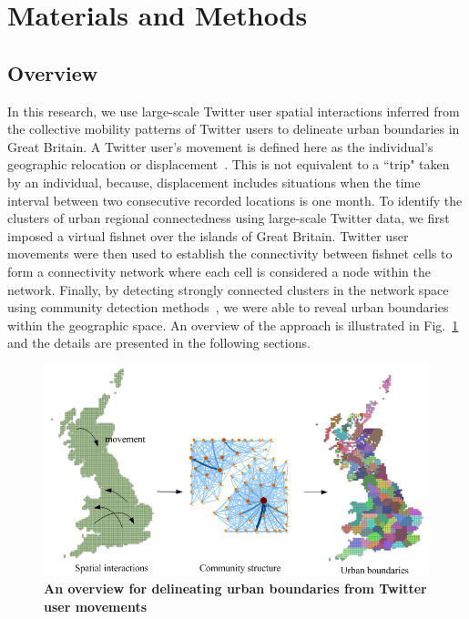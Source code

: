 \documentclass[]{tGIS2e}
\begin{document}
{\section{Materials and Methods}
\subsection{Overview}
In this research, we use large-scale Twitter user spatial interactions inferred from the collective mobility patterns of Twitter users to delineate urban boundaries in Great Britain.
A Twitter user's movement is defined here as the individual's geographic relocation or displacement~\citep{gonzalez2008}.
This is not equivalent to a ``trip" taken by an individual, because, displacement includes situations when the time interval between two consecutive recorded locations is one month.
To identify the clusters of urban regional connectedness using large-scale Twitter data, we first imposed a virtual fishnet over the islands of Great Britain.
Twitter user movements were then used to establish the connectivity between fishnet cells to form a connectivity network where each cell is considered a node within the network. 
Finally, by detecting strongly connected clusters in the network space using community detection methods~\citep{coscia2011}, we were able to reveal urban boundaries within the geographic space. 
An overview of the approach is illustrated in Fig.~\ref{S1_Fig} and the details are presented in the following sections. 

\begin{figure}[ht]
\begin{center}
\includegraphics[width=1\linewidth]{./figure/S1_overview_Fig_2}
\caption{\bfseries{An overview for delineating urban boundaries from Twitter user movements}}
\label{S1_Fig}
\end{center}
\end{figure}

}
\end{document}
